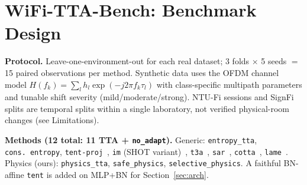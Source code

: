 \section{WiFi-TTA-Bench: Benchmark Design}

\begin{table}[h]
\centering
\caption{Datasets and methods. The \textbf{Shape} column reports $(\text{features},\text{time/packets})$ per sample for the prepared CSI tensors used by the benchmark; the SignFi-10 row reports $(\text{flattened features},\text{prepared dim})$. Full dataset protocol, per-method hyperparameters, and absolute baselines are in Appendix~\ref{app:hyperparams}/\ref{app:datasheet}.}
\label{tab:datasets}
\small
{}
\end{table}

\textbf{Protocol.} Leave-one-environment-out for each real dataset; 3 folds $\times$ 5 seeds $=$ 15 paired observations per method. Synthetic data uses the OFDM channel model $H(f_k)=\sum_l h_l \exp(-j2\pi f_k \tau_l)$ with class-specific multipath parameters and tunable shift severity (mild/moderate/strong). NTU-Fi sessions and SignFi splits are temporal splits within a single laboratory, not verified physical-room changes (see Limitations).

\textbf{Methods (12 total: 11 TTA + \texttt{no\_adapt}).} Generic: \texttt{entropy\_tta}, \texttt{cons.~entropy}, \texttt{tent-proj}~\cite{wang2021tent}, \texttt{im} (SHOT variant)~\cite{liang2020shot}, \texttt{t3a}~\cite{iwasawa2021t3a}, \texttt{sar}~\cite{niu2023sar}, \texttt{cotta}~\cite{wang2022cotta}, \texttt{lame}~\cite{boudiaf2022lame}. Physics (ours): \texttt{physics\_tta}, \texttt{safe\_physics}, \texttt{selective\_physics}. A faithful BN-affine \texttt{tent} is added on MLP+BN for Section~\ref{sec:arch}.

